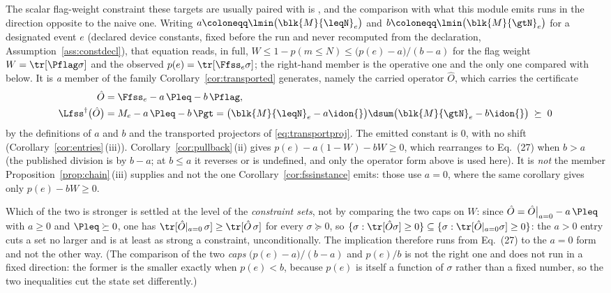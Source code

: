 \begin{remark}
The scalar flag-weight constraint these targets are usually paired with is
\cite[Eq.~(27)]{nahar2024postselection}, and the comparison with what this
module emits runs in the direction opposite to the naive one. Writing
$a\coloneqq\lmin\big(\blk{M}{\leqN}_e\big)$ and
$b\coloneqq\lmin\big(\blk{M}{\gtN}_e\big)$ for a designated event $e$
(declared device constants, fixed before the run and never recomputed from
the declaration, Assumption~\ref{ass:constdecl}), that
equation reads, in full, $W\le1-p(m\le N)\le\big(p(e)-a\big)/(b-a)$ for the
flag weight $W=\tr[\Pflag\sigma]$ and the observed
$p(e)=\tr[\Ffss_e\sigma]$;
the right-hand member is the operative one and the only one compared with
below. It is
\emph{a} member of the family Corollary~\ref{cor:transported} generates,
namely the carried operator $\hat O$, which carries the certificate
\begin{equation}\label{eq:two-sector-entry}
\begin{split}
  \hat O&=\Ffss_e-a\,\Pleq-b\,\Pflag,\\
  \Lfss^{\dagger}\big(\hat O\big)&=M_e-a\,\Pleq-b\,\Pgt
  =\big(\blk{M}{\leqN}_e-a\idon{}\big)
    \dsum\big(\blk{M}{\gtN}_e-b\idon{}\big)
  \;\succeq\;0
\end{split}
\end{equation}
by the definitions of $a$ and $b$ and the transported projectors of
\eqref{eq:transportproj}. The emitted constant is $0$, with no shift
(Corollary~\ref{cor:entries}\,(iii)).
Corollary~\ref{cor:pullback}\,(ii) gives
$p(e)-a(1-W)-bW\ge0$, which rearranges to Eq.~(27) when $b>a$ (the published
division is by $b-a$; at $b\le a$ it reverses or is undefined, and only the
operator form above is used here). It is \emph{not} the member
Proposition~\ref{prop:chain}\,(iii) supplies and not the one
Corollary~\ref{cor:fssinstance} emits: those use $a=0$, where the same
corollary gives only $p(e)-bW\ge0$.

Which of the two is stronger is settled at the level of the \emph{constraint
sets}, not by comparing the two caps on $W$: since
$\hat O=\hat O\big|_{a=0}-a\,\Pleq$ with $a\ge0$ and $\Pleq\succeq0$, one has
$\tr[\hat O|_{a=0}\,\sigma]\ge\tr[\hat O\,\sigma]$ for every $\sigma\succeq0$,
so $\{\sigma:\tr[\hat O\sigma]\ge0\}\subseteq
\{\sigma:\tr[\hat O|_{a=0}\sigma]\ge0\}$: the $a>0$ entry cuts a set no
larger and is at least as strong a constraint, unconditionally. The implication
therefore runs from Eq.~(27) to the $a=0$ form and not the other way. (The
comparison of the two \emph{caps} $\big(p(e)-a\big)/(b-a)$ and $p(e)/b$ is not
the right one and does not run in a fixed direction: the former is the smaller
exactly when $p(e)<b$, because $p(e)$ is itself a function of $\sigma$ rather
than a fixed number, so the two inequalities cut the state set differently.)


\end{remark}
